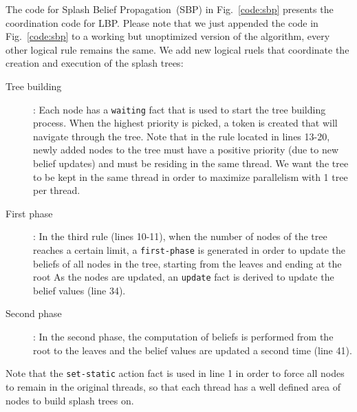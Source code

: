 The code for Splash Belief Propagation~(SBP) in Fig.~\ref{code:sbp} presents the
coordination code for LBP.  Please note that we just appended the code in
Fig.~\ref{code:sbp} to a working but unoptimized version of the algorithm, every
other logical rule remains the same. We add new logical ruels that coordinate
the creation and execution of the splash trees:

\begin{description}
   \item[Tree building]: Each node has a \texttt{waiting} fact that is used to
   start the tree building process. When the highest priority is picked, a token
   is created that will navigate through the tree. Note that in the rule located
   in lines 13-20, newly added nodes to the tree must have a positive priority
   (due to new belief updates) and must be residing in the same thread.
   We want the tree to be kept in the same thread in order to maximize
   parallelism with 1 tree per thread.
   \item[First phase]: In the third rule (lines 10-11), when the number of nodes
   of the tree reaches a certain limit, a 
   \texttt{first-phase} is generated in order to update the beliefs of all nodes
   in the tree, starting from the leaves and ending at the root
   As the nodes are updated, an \texttt{update} fact is derived to update
   the belief values (line 34).
   \item[Second phase]: In the second phase, the computation of beliefs is
   performed from the root to the leaves and the belief values are updated a
   second time (line 41).
\end{description}

Note that the \texttt{set-static} action fact is used in line 1 in order to
force all nodes to remain in the original threads, so that each thread has a
well defined area of nodes to build splash trees on.


